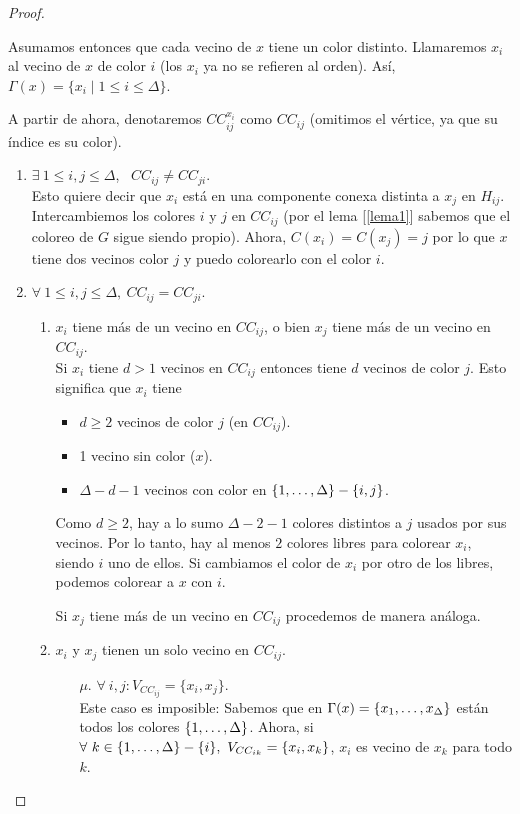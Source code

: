 \begin{proof}
\begin{enumerate}
    Asumamos entonces que cada vecino de $x$ tiene un color distinto. Llamaremos $x_i$ al vecino de $x$ de color $i$ (los $x_i$ ya no se refieren al orden). Así, $\Gamma(x) = \{x_i \mid 1 \le i \le \Delta\}$.

    A partir de ahora, denotaremos $CC^{x_i}_{ij}$ como $CC_{ij}$ (omitimos el vértice, ya que su índice es su color).
    \begin{enumerate}
    \item \label{CCneq} $\exists~ 1 \le i,j \le \Delta$,~ $CC_{ij} \neq CC_{ji}$.\\
    Esto quiere decir que $x_i$ está en una componente conexa distinta a $x_j$ en $H_{ij}$. Intercambiemos los colores $i$ y $j$ en $CC_{ij}$ (por el lema [\ref{lema1}] sabemos que el coloreo de $G$ sigue siendo propio). Ahora, $C(x_i) = C(x_j) = j$ por lo que $x$ tiene dos vecinos color $j$ y puedo colorearlo con el color $i$.
    
    \item $\forall~ 1 \le i,j \le \Delta,~ CC_{ij} = CC_{ji}$.
    \begin{enumerate}
    \item $x_i$ tiene más de un vecino en $CC_{ij}$, o bien $x_j$ tiene más de un vecino en $CC_{ij}$.\\
    Si $x_i$ tiene $d > 1$ vecinos en $CC_{ij}$ entonces tiene $d$ vecinos de color $j$. Esto significa que $x_i$ tiene
    \begin{itemize}
        \item $d \ge 2$ vecinos de color $j$ (en $CC_{ij}$).
        \item 1 vecino sin color ($x$).
        \item $\Delta - d - 1$ vecinos con color en $\{1, \mathellipsis, \Delta\} - \{i, j\}$.
    \end{itemize}
    Como $d \ge 2$, hay a lo sumo $\Delta - 2 - 1$ colores distintos a $j$ usados por sus vecinos. Por lo tanto, hay al menos $2$ colores libres para colorear $x_i$, siendo $i$ uno de ellos. Si cambiamos el color de $x_i$ por otro de los libres, podemos colorear a $x$ con $i$.
    
    Si $x_j$ tiene más de un vecino en $CC_{ij}$ procedemos de manera análoga.
    
    \item $x_i$ y $x_j$ tienen un solo vecino en $CC_{ij}$.
    \begin{itemize}
        \item [$\mu.$] $\forall~ i,j: V_{CC_{ij}} = \{x_i, x_j\}$.\\
        Este caso es imposible: Sabemos que en $\Gamma(x) = \{x_1, \mathellipsis, x_{\Delta}\}$ están todos los colores $\{1, \mathellipsis, \Delta\}$. Ahora, si $\forall~ k \in \{1, \mathellipsis, \Delta\} - \{i\},~ V_{CC_{ik}} = \{x_i, x_k\}$, $x_i$ es vecino de $x_k$ para todo $k$.
        

\end{itemize}
\end{enumerate}
\end{enumerate}
\end{enumerate}
\end{proof}
